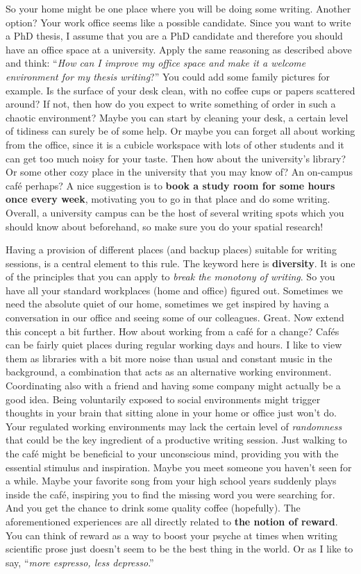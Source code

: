 \documentclass[
  12pt,
]{book}
\begin{document}
So your home might be one place where you will be doing some writing.
Another option?
Your work office seems like a possible candidate.
Since you want to write a PhD thesis, I assume that you are a PhD candidate and therefore you should have an office space at a university.
Apply the same reasoning as described above and think: ``\emph{How can I improve my office space and make it a welcome environment for my thesis writing}?''
You could add some family pictures for example.
Is the surface of your desk clean, with no coffee cups or papers scattered around?
If not, then how do you expect to write something of order in such a chaotic environment?
Maybe you can start by cleaning your desk, a certain level of tidiness can surely be of some help.
Or maybe you can forget all about working from the office, since it is a cubicle workspace with lots of other students and it can get too much noisy for your taste.
Then how about the university's library?
Or some other cozy place in the university that you may know of?
An on-campus café perhaps?
A nice suggestion is to \textbf{book a study room for some hours once every week}, motivating you to go in that place and do some writing.
Overall, a university campus can be the host of several writing spots which you should know about beforehand, so make sure you do your spatial research!

Having a provision of different places (and backup places) suitable for writing sessions, is a central element to this rule.
The keyword here is \textbf{diversity}.
It is one of the principles that you can apply to \emph{break the monotony of writing}.
So you have all your standard workplaces (home and office) figured out.
Sometimes we need the absolute quiet of our home, sometimes we get inspired by having a conversation in our office and seeing some of our colleagues.
Great.
Now extend this concept a bit further.
How about working from a café for a change?
Cafés can be fairly quiet places during regular working days and hours.
I like to view them as libraries with a bit more noise than usual and constant music in the background, a combination that acts as an alternative working environment.
Coordinating also with a friend and having some company might actually be a good idea.
Being voluntarily exposed to social environments might trigger thoughts in your brain that sitting alone in your home or office just won't do.
Your regulated working environments may lack the certain level of \emph{randomness} that could be the key ingredient of a productive writing session.
Just walking to the café might be beneficial to your unconscious mind, providing you with the essential stimulus and inspiration.
Maybe you meet someone you haven't seen for a while.
Maybe your favorite song from your high school years suddenly plays inside the café, inspiring you to find the missing word you were searching for.
And you get the chance to drink some quality coffee (hopefully).
The aforementioned experiences are all directly related to \textbf{the notion of reward}.
You can think of reward as a way to boost your psyche at times when writing scientific prose just doesn't seem to be the best thing in the world.
Or as I like to say, ``\emph{more espresso, less depresso}.''
\end{document}
